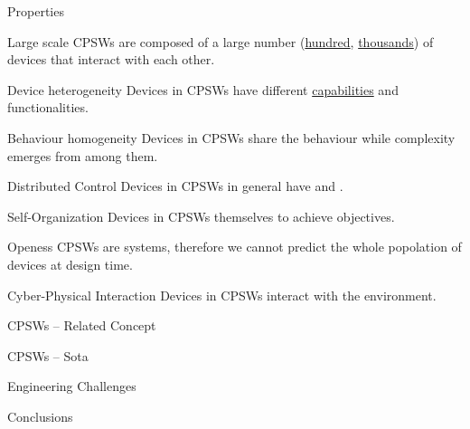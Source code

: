 \documentclass[presentation, 9pt]{beamer}\mode<presentation>{\usetheme{AMSBolognaFC}}
\begin{document}
\begin{frame}[allowframebreaks]{Properties}
  \begin{exampleblock}{Large scale}
    CPSWs are composed of a large number (\underline{hundred}, \underline{thousands}) of devices that interact with each other. \\
  \end{exampleblock}
  \begin{exampleblock}{Device heterogeneity}
    Devices in CPSWs have different \underline{capabilities} and functionalities. \\
  \end{exampleblock}
  \begin{exampleblock}{Behaviour homogeneity}
    Devices in CPSWs share the  behaviour while complexity emerges from  among them. \\
  \end{exampleblock}
  \begin{exampleblock}{Distributed Control}
    Devices in CPSWs in general have  and . \\
  \end{exampleblock}
  \begin{exampleblock}{Self-Organization}
    Devices in CPSWs  themselves to achieve  objectives. \\
  \end{exampleblock}
  \begin{exampleblock}{Openess}
    CPSWs are  systems, therefore we cannot predict the whole popolation of devices at design time. \\
  \end{exampleblock}
  \begin{exampleblock}{Cyber-Physical Interaction}
    Devices in CPSWs interact with the  environment. \\
  \end{exampleblock}
\end{frame}
\begin{frame}{CPSWs -- Related Concept}

\end{frame}
\begin{frame}{CPSWs -- Sota}

\end{frame}
\begin{frame}{Engineering Challenges}

\end{frame}
\begin{frame}{Conclusions}
\end{frame}
\end{document}
